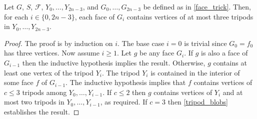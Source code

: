 \documentclass{patmorin}
\begin{document}
\begin{lem}
  Let $G$, $S$, $\mathcal{F}$, $Y_0,\ldots,Y_{2n-3}$, and $G_0,\ldots,G_{2n-3}$ be defined as in \cref{face_trick}. Then, for each $i\in\{0,2n-3\}$, each face of $G_i$ contains vertices of at most three tripods in $Y_0,\ldots,Y_{2n-3}$.
\end{lem}

\begin{proof}
  The proof is by induction on $i$.  The base case $i=0$ is trivial since $G_0=f_0$ has three vertices.  Now assume $i\ge 1$. Let $g$ be any face $G_i$.  If $g$ is also a face of $G_{i-1}$ then the inductive hypothesis implies the result.  Otherwise, $g$ contains at least one vertex of the tripod $Y_i$.  The tripod $Y_i$ is contained in the interior of some face $f$ of $G_{i-1}$.  The inductive hypothesis implies that $f$ contains vertices of $c\le 3$ tripods among $Y_{0},\ldots,Y_{i-1}$.  If $c\le 2$ then $g$ contains vertices of $Y_i$ and at most two tripods in $Y_0,\ldots,Y_{i-1}$, as required.  If $c=3$ then \cref{tripod_blobs} establishes the result.
\end{proof}
\end{document}
